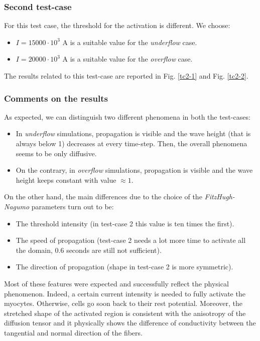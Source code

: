 \documentclass[a4paper,11pt]{article}
\begin{document}
\subsubsection{Second test-case}
For this test case, the threshold for the activation is different. We choose:
\begin{itemize}
	\item $I = 15000 \cdot 10^3 $ A is a suitable value for the \emph{underflow} case.
	\item $I = 20000 \cdot 10^3 $ A is a suitable value for the \emph{overflow} case.
\end{itemize}

\noindent The results related to this test-case are reported in Fig. \ref{tc2-1} and Fig. \ref{tc2-2}.

\subsubsection{Comments on the results}
As expected, we can distinguish two different phenomena in both the test-cases:
\begin{itemize}
	\item In \emph{underflow} simulations, propagation is visible and the wave height (that is always below 1) decreases at every time-step. Then, the overall phenomena seems to be only diffusive.
	\item On the contrary, in \emph{overflow} simulations, propagation is visible and the wave height keeps constant with value $\approx 1$.  
\end{itemize}

\noindent On the other hand, the main differences due to the choice of the \emph{FitzHugh-Nagumo} parameters turn out to be:
\begin{itemize}
	\item The threshold intensity (in test-case 2 this value is ten times the first).
	\item The speed of propagation (test-case 2 needs a lot more time to activate all the domain, 0.6 seconds are still not sufficient).
	\item The direction of propagation (shape in test-case 2 is more symmetric).
\end{itemize}
 
\noindent Most of these features were expected and successfully reflect the physical phenomenon. Indeed, a certain current intensity is needed to fully activate the myocytes. Otherwise, cells go soon back to their rest potential. Moreover, the stretched shape of the activated region is consistent with the anisotropy of the diffusion tensor and it physically shows the difference of conductivity between the tangential and normal direction of the fibers.\\
\end{document}
